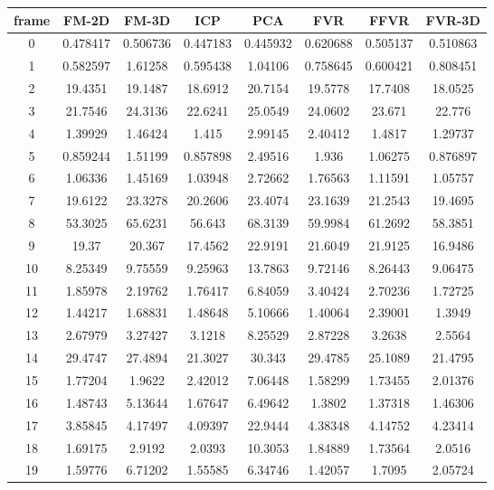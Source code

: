 
\begin{figure}
\centering
\begin{tabular}{cccccccc}
\hline
\textbf{frame} & \textbf{FM-2D} & \textbf{FM-3D} & \textbf{ICP} & \textbf{PCA} & \textbf{FVR} & \textbf{FFVR} & \textbf{FVR-3D}
\\ \hline
0 & 0.478417 & 0.506736 & 0.447183 & 0.445932 & 0.620688 & 0.505137 & 0.510863\\
1 & 0.582597 & 1.61258 & 0.595438 & 1.04106 & 0.758645 & 0.600421 & 0.808451\\
2 & 19.4351 & 19.1487 & 18.6912 & 20.7154 & 19.5778 & 17.7408 & 18.0525\\
3 & 21.7546 & 24.3136 & 22.6241 & 25.0549 & 24.0602 & 23.671 & 22.776\\
4 & 1.39929 & 1.46424 & 1.415 & 2.99145 & 2.40412 & 1.4817 & 1.29737\\
5 & 0.859244 & 1.51199 & 0.857898 & 2.49516 & 1.936 & 1.06275 & 0.876897\\
6 & 1.06336 & 1.45169 & 1.03948 & 2.72662 & 1.76563 & 1.11591 & 1.05757\\
7 & 19.6122 & 23.3278 & 20.2606 & 23.4074 & 23.1639 & 21.2543 & 19.4695\\
8 & 53.3025 & 65.6231 & 56.643 & 68.3139 & 59.9984 & 61.2692 & 58.3851\\
9 & 19.37 & 20.367 & 17.4562 & 22.9191 & 21.6049 & 21.9125 & 16.9486\\
10 & 8.25349 & 9.75559 & 9.25963 & 13.7863 & 9.72146 & 8.26443 & 9.06475\\
11 & 1.85978 & 2.19762 & 1.76417 & 6.84059 & 3.40424 & 2.70236 & 1.72725\\
12 & 1.44217 & 1.68831 & 1.48648 & 5.10666 & 1.40064 & 2.39001 & 1.3949\\
13 & 2.67979 & 3.27427 & 3.1218 & 8.25529 & 2.87228 & 3.2638 & 2.5564\\
14 & 29.4747 & 27.4894 & 21.3027 & 30.343 & 29.4785 & 25.1089 & 21.4795\\
15 & 1.77204 & 1.9622 & 2.42012 & 7.06448 & 1.58299 & 1.73455 & 2.01376\\
16 & 1.48743 & 5.13644 & 1.67647 & 6.49642 & 1.3802 & 1.37318 & 1.46306\\
17 & 3.85845 & 4.17497 & 4.09397 & 22.9444 & 4.38348 & 4.14752 & 4.23414\\
18 & 1.69175 & 2.9192 & 2.0393 & 10.3053 & 1.84889 & 1.73564 & 2.0516\\
19 & 1.59776 & 6.71202 & 1.55585 & 6.34746 & 1.42057 & 1.7095 & 2.05724\\

\end{tabular}
\end{figure}
